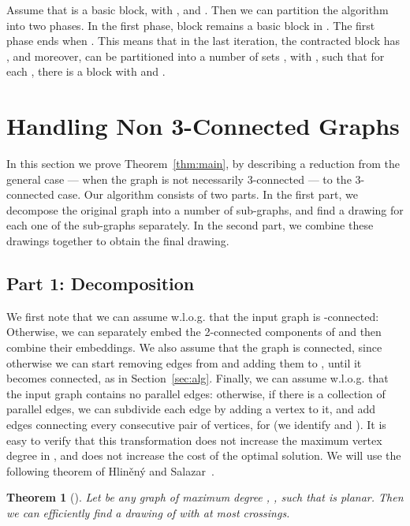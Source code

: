 \documentclass[twoside,leqno,twocolumn]{article}
\newtheorem{theorem}{Theorem}
\begin{document}
Assume that  is a basic block, with , and . Then we can partition the algorithm into two phases. In the first phase, block  remains a basic block in . The first phase ends when . This means that in the last iteration, the contracted block  has , and moreover,  can be partitioned into a number of sets , with , such that for each , there is a block  with  and . 


\fi


\iffull
\section{Handling Non 3-Connected Graphs} \label{sec:reduce-three-connected}



In this section we prove Theorem~\ref{thm:main}, by describing a reduction from the general case --- when
the graph  is not necessarily 3-connected --- to the 3-connected case. 
Our algorithm consists of two parts. In the first part, we decompose the original graph  into a number of sub-graphs, and find a drawing for each one of the sub-graphs separately. In the second part, we combine these drawings together to obtain the final drawing.

\subsection{Part 1: Decomposition}
We first note that we can assume w.l.o.g. that the input graph  is -connected:
Otherwise, we can separately embed the 2-connected components of  and then combine their embeddings.
We also assume that the graph  is connected, since otherwise we can start removing edges from  and adding them to , until it becomes connected, as in Section~\ref{sec:alg}. Finally, we can assume w.l.o.g. that the input graph contains no parallel edges: otherwise, if there is a collection  of parallel edges, we can subdivide each edge  by adding a vertex  to it, and add edges connecting every consecutive pair  of vertices, for  (we identify  and ). It is easy to verify that this transformation does not increase the maximum vertex degree in , and does not increase the cost of the optimal solution.
We will use the following theorem of Hlin\v{e}n\'{y} and Salazar~\cite{HlinenyS06}.

\begin{theorem}[\cite{HlinenyS06}]\label{thm planar and edge}
Let  be any graph of maximum degree , , such that  is planar. Then we can efficiently find a drawing  of  with at most  crossings.
\end{theorem}
\end{document}
